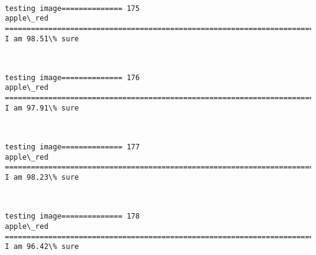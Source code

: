 \documentclass[11pt]{article}
\begin{document}
    \begin{center}
    \end{center}
    { \hspace*{\fill} \\}
    
    \begin{Verbatim}[commandchars=\\\{\}]
testing image============== 175
apple\_red
============================================================================
I am 98.51\% sure

    \end{Verbatim}

    \begin{center}
    \end{center}
    { \hspace*{\fill} \\}
    
    \begin{Verbatim}[commandchars=\\\{\}]
testing image============== 176
apple\_red
============================================================================
I am 97.91\% sure

    \end{Verbatim}

    \begin{center}
    \end{center}
    { \hspace*{\fill} \\}
    
    \begin{Verbatim}[commandchars=\\\{\}]
testing image============== 177
apple\_red
============================================================================
I am 98.23\% sure

    \end{Verbatim}

    \begin{center}
    \end{center}
    { \hspace*{\fill} \\}
    
    \begin{Verbatim}[commandchars=\\\{\}]
testing image============== 178
apple\_red
============================================================================
I am 96.42\% sure

    \end{Verbatim}
\end{document}
